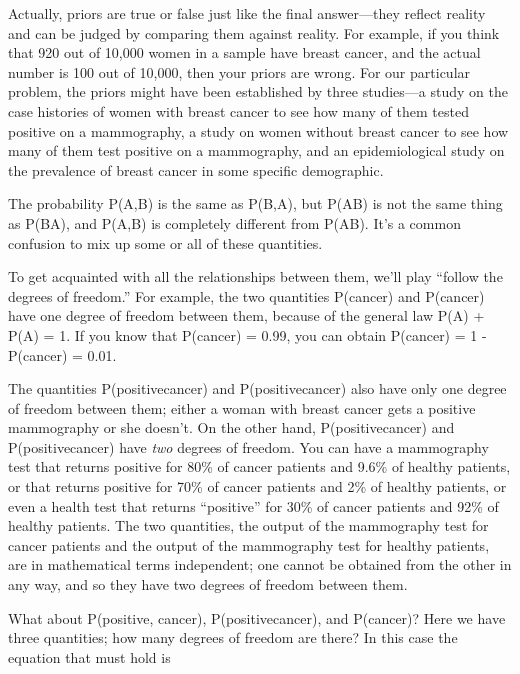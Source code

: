 {
 Actually, priors are true or false just like the final
answer---they reflect reality and can be judged by comparing them
against reality. For example, if you think that 920 out of 10,000 women
in a sample have breast cancer, and the actual number is 100 out of
10,000, then your priors are wrong. For our particular problem, the
priors might have been established by three studies---a study on the
case histories of women with breast cancer to see how many of them
tested positive on a mammography, a study on women without breast
cancer to see how many of them test positive on a mammography, and an
epidemiological study on the prevalence of breast cancer in some
specific demographic.}

{
 The probability P(A,B) is the same as P(B,A), but P(A{\textbar}B)
is not the same thing as P(B{\textbar}A), and P(A,B) is completely
different from P(A{\textbar}B). It's a common confusion
to mix up some or all of these quantities.}

{
 To get acquainted with all the relationships between them,
we'll play ``follow the degrees of
freedom.'' For example, the two quantities P(cancer)
and P({\textlnot}cancer) have one degree of freedom between them,
because of the general law P(A) + P({\textlnot}A) = 1. If you know that
P({\textlnot}cancer) = 0.99, you can obtain P(cancer) = 1 -
P({\textlnot}cancer) = 0.01.}

{
 The quantities P(positive{\textbar}cancer) and
P({\textlnot}positive{\textbar}cancer) also have only one degree of
freedom between them; either a woman with breast cancer gets a positive
mammography or she doesn't. On the other hand,
P(positive{\textbar}cancer) and P(positive{\textbar}{\textlnot}cancer)
have \textit{two} degrees of freedom. You can have a mammography test
that returns positive for 80\% of cancer patients and 9.6\% of healthy
patients, or that returns positive for 70\% of cancer patients and 2\%
of healthy patients, or even a health test that returns
``positive'' for 30\% of cancer
patients and 92\% of healthy patients. The two quantities, the output
of the mammography test for cancer patients and the output of the
mammography test for healthy patients, are in mathematical terms
independent; one cannot be obtained from the other in any way, and so
they have two degrees of freedom between them.}

{
 What about P(positive, cancer), P(positive{\textbar}cancer), and
P(cancer)? Here we have three quantities; how many degrees of freedom
are there? In this case the equation that must hold is}

